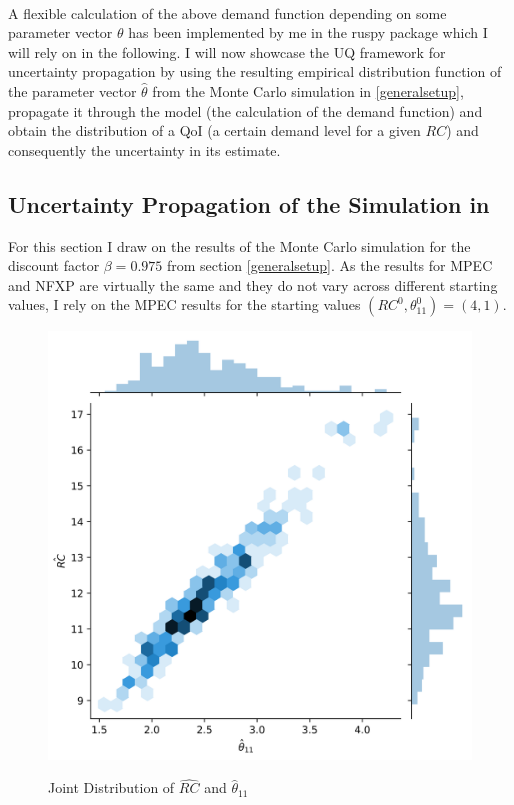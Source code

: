 \paragraph{}

A flexible calculation of the above demand function depending on some parameter vector $\theta$ has been implemented by me in the ruspy package which I will rely on in the following. I will now showcase the UQ framework for uncertainty propagation by using the resulting empirical distribution function of the parameter vector $\hat\theta$ from the Monte Carlo simulation in \ref{generalsetup}, propagate it through the model (the calculation of the demand function) and obtain the distribution of a QoI (a certain demand level for a given $RC$) and consequently the uncertainty in its estimate.

\subsection{Uncertainty Propagation of the Simulation in \cite{Iskhakov.2016}}

For this section I draw on the results of the Monte Carlo simulation for the discount factor $\beta=0.975$ from section \ref{generalsetup}. As the results for MPEC and NFXP are virtually the same and they do not vary across different starting values, I rely on the MPEC results for the starting values $(RC^0, \theta^0_{11}) = (4,1)$.

\begin{figure}[!b]
	\caption{Joint Distribution of $\hat{RC}$ and $\hat\theta_{11}$}
	\centering
	\includegraphics[scale=0.8]{../figures/figure_2.png}
	\label{figure2}
\end{figure}

